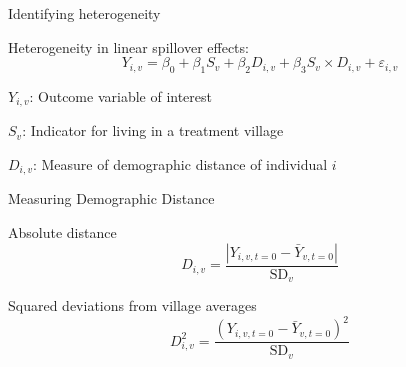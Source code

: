 \documentclass[14pt, aspectratio=169]{beamer}
\newenvironment{wideitemize}{\itemize\addtolength{\itemsep}{10pt}}{\enditemize}
\let\OLDitemize\itemize
\renewcommand\itemize{\OLDitemize\addtolength{\itemsep}{10pt}}
\begin{document}
\begin{frame}{Identifying heterogeneity}
\begin{wideitemize}
	\item Heterogeneity in linear spillover effects:
	\begin{equation*} \label{eq:interaction}
	Y_{i,v} = \beta_0 + \beta_1 S_v + \beta_2 D_{i,v} + \beta_3 S_v \times  D_{i,v} + \varepsilon_{i,v}
	\end{equation*}

	\item $Y_{i,v}$: Outcome variable of interest
    \item $S_v$: Indicator for living in a treatment village
    \item $D_{i,v}$: Measure of demographic distance of individual $i$

\end{wideitemize}
\end{frame}

\begin{frame}{Measuring Demographic Distance}
\begin{wideitemize}
	\item Absolute distance
	$$D_{i,v}  = \frac{|Y_{i,v,t=0} - \bar Y_{v,t=0}|}{\text{SD}_v} $$
	\item Squared deviations from village averages
	$$ D^2_{i,v}= \frac{(Y_{i,v,t=0} - \bar Y_{v,t=0})^2}{\text{SD}_v} $$
\end{wideitemize}
\end{frame}
\end{document}
